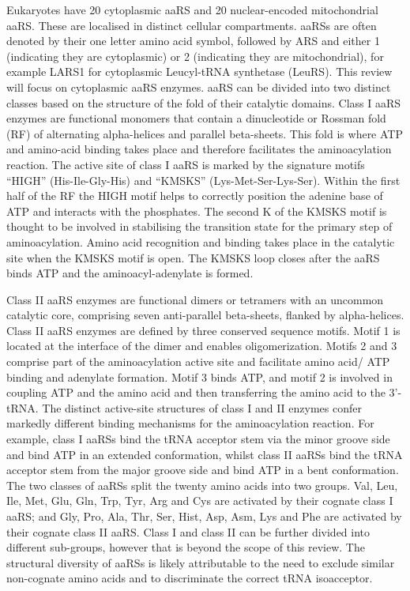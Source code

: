 Eukaryotes have 20 cytoplasmic aaRS and 20 nuclear-encoded mitochondrial aaRS.
These are localised in distinct cellular compartments.
aaRSs are often denoted by their one letter amino acid symbol, followed by ARS and either 1 (indicating they are cytoplasmic) or 2 (indicating they are mitochondrial), for example LARS1 for cytoplasmic Leucyl-tRNA synthetase (LeuRS).
This review will focus on cytoplasmic aaRS enzymes.
aaRS can be divided into two distinct classes based on the structure of the fold of their catalytic domains.
Class I aaRS enzymes are functional monomers that contain a dinucleotide or Rossman fold (RF) of alternating alpha-helices and parallel beta-sheets.
This fold is where ATP and amino-acid binding takes place and therefore facilitates the aminoacylation reaction.
The active site of class I aaRS is marked by the signature motifs ``HIGH'' (His-Ile-Gly-His) and ``KMSKS'' (Lys-Met-Ser-Lys-Ser).
Within the first half of the RF the HIGH motif helps to correctly position the adenine base of ATP and interacts with the phosphates.
The second K of the KMSKS motif is thought to be involved in stabilising the transition state for the primary step of aminoacylation\cite{newberry2002structural}.
Amino acid recognition and binding takes place in the catalytic site when the KMSKS motif is open.
The KMSKS loop closes after the aaRS binds ATP and the aminoacyl-adenylate is formed\cite{kwon2019aminoacyl}.

Class II aaRS enzymes are functional dimers or tetramers with an uncommon catalytic core, comprising seven anti-parallel beta-sheets, flanked by alpha-helices.
Class II aaRS enzymes are defined by three conserved sequence motifs.
Motif 1 is located at the interface of the dimer and enables oligomerization.
Motifs 2 and 3 comprise part of the aminoacylation active site and facilitate amino acid/ ATP binding and adenylate formation.
Motif 3 binds ATP, and motif 2 is involved in coupling ATP and the amino acid and then transferring the amino acid to the 3'-tRNA\cite{kwon2019aminoacyl}.
The distinct active-site structures of class I and II enzymes confer markedly different binding mechanisms for the aminoacylation reaction.
For example, class I aaRSs bind the tRNA acceptor stem via the minor groove side and bind ATP in an extended conformation, whilst class II aaRSs bind the tRNA acceptor stem from the major groove side and bind ATP in a bent conformation.
The two classes of aaRSs split the twenty amino acids into two groups.
Val, Leu, Ile, Met, Glu, Gln, Trp, Tyr, Arg and Cys are activated by their cognate class I aaRS; and Gly, Pro, Ala, Thr, Ser, Hist, Asp, Asm, Lys and Phe are activated by their cognate class II aaRS.
Class I and class II can be further divided into different sub-groups, however that is beyond the scope of this review.
The structural diversity of aaRSs is likely attributable to the need to exclude similar non-cognate amino acids and to discriminate the correct tRNA isoacceptor.

